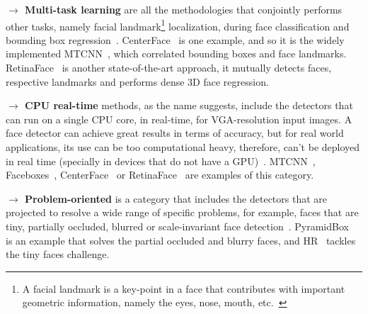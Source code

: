 \documentclass[class=report, crop=false, a4paper, 12pt]{standalone}
\begin{document}
\vspace{0.7\baselineskip}
\noindent\textbf{$\rightarrow$ Multi-task learning} are all the methodologies that conjointly performs other tasks, namely facial landmark\footnote{A facial landmark is a key-point in a face that contributes with important geometric information, namely the eyes, nose, mouth, etc.~\autocite{fengWingLossRobust2018}} localization, during face classification and bounding box regression~\autocite{duElementsEndtoendDeep2022}. CenterFace~\autocite{xuCenterFaceJointFace2019} is one example, and so it is the widely implemented MTCNN~\autocite{zhangJointFaceDetection2016a}, which correlated bounding boxes and face landmarks. RetinaFace~\autocite{dengRetinaFaceSinglestageDense2019} is another state-of-the-art approach, it mutually detects faces, respective landmarks and performs dense 3D face regression.

\vspace{0.7\baselineskip}
\noindent\textbf{$\rightarrow$ CPU real-time} methods, as the name suggests, include the detectors that can run on a single CPU core, in real-time, for VGA-resolution input images. A face detector can achieve great results in terms of accuracy, but for real world applications, its use can be too computational heavy, therefore, can't be deployed in real time (specially in devices that do not have a GPU)~\autocite{duElementsEndtoendDeep2022}. MTCNN~\autocite{zhangJointFaceDetection2016a}, Faceboxes~\autocite{zhangFaceBoxesCPURealtime2018}, CenterFace~\autocite{xuCenterFaceJointFace2019} or RetinaFace~\autocite{dengRetinaFaceSinglestageDense2019} are examples of this category.

\vspace{0.7\baselineskip}
\noindent\textbf{$\rightarrow$ Problem-oriented} is a category that includes the detectors that are projected to resolve a wide range of specific problems, for example, faces that are tiny, partially occluded, blurred or scale-invariant face detection~\autocite{duElementsEndtoendDeep2022}. PyramidBox~\autocite{tangPyramidBoxContextassistedSingle2018} is an example that solves the partial occluded and blurry faces, and HR~\autocite{huFindingTinyFaces2017} tackles the tiny faces challenge.


\end{document}
